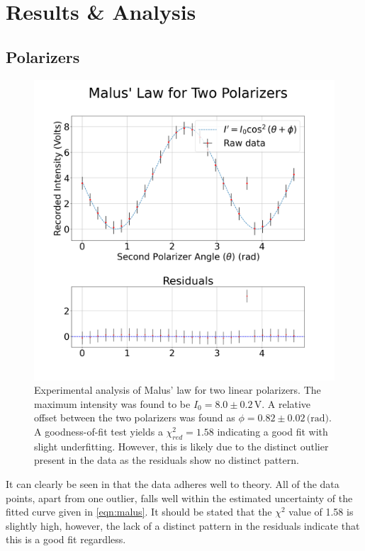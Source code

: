\documentclass[aip, cp, amsmath, amssymb, reprint]{revtex4-2}
\begin{document}
    \section{Results \& Analysis}
        \subsection{Polarizers}
            \begin{figure}[H]
                \centering
                \includegraphics[width=0.9\linewidth]{../figures/Malus.png}
                \caption{Experimental analysis of Malus' law for two linear polarizers. The maximum intensity was found to be $I_0 = 8.0 \pm 0.2\,\text{V}$. A relative offset between the two polarizers was found as $\phi = 0.82 \pm 0.02\,\text{(rad)}$. A goodness-of-fit test yields a $\chi_{red}^2 = 1.58$ indicating a good fit with slight underfitting. However, this is likely due to the distinct outlier present in the data as the residuals show no distinct pattern.}
                \label{fig:part1}
            \end{figure}

            It can clearly be seen in  that the data adheres well to theory. All of the data points, apart from one outlier, falls well within the estimated uncertainty of the fitted curve given in \eqref{eqn:malus}. It should be stated that the $\chi^2$ value of 1.58 is slightly high, however, the lack of a distinct pattern in the residuals indicate that this is a good fit regardless.
\end{document}
